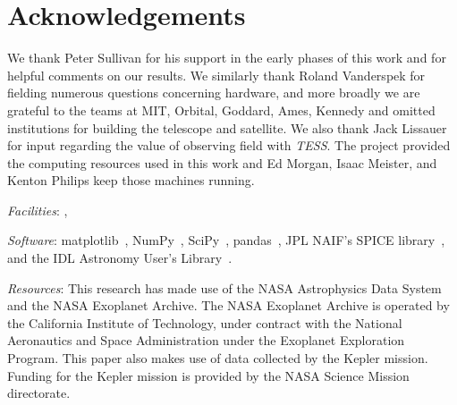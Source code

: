 \section*{Acknowledgements}
We thank Peter Sullivan for his support in the early phases of this 
work and for helpful comments on our results.
We similarly thank Roland Vanderspek for fielding numerous questions
concerning \tess hardware, and more broadly we are grateful to the teams 
at MIT, Orbital, Goddard, Ames, Kennedy and omitted institutions for 
building the telescope and satellite.
We also thank Jack Lissauer for input regarding the value of observing 
\keplers field with \textit{TESS}.
The \tess project provided the computing resources used in this work and Ed 
Morgan, Isaac Meister, and Kenton Philips keep those machines running.

\vspace{0.5cm}
\textit{Facilities}: \tess, \kepler

\textit{Software}: matplotlib~\citep{hunter_matplotlib_2007}, NumPy~\citep{walt_numpy_2011}, SciPy~\citep{jones_scipy_2001}, pandas~\citep{mckinneypandas}, JPL NAIF's SPICE library~\citep{acton_SPICE_1996}, and the IDL Astronomy User's Library~\citep{landsman_idl_1995}.

\textit{Resources}: This research has made use of the NASA Astrophysics Data System and the NASA Exoplanet Archive. The NASA Exoplanet Archive is operated by the California Institute of Technology, under contract with the National Aeronautics and Space Administration under the Exoplanet Exploration Program.
This paper also makes use of data collected by the Kepler mission. Funding for the Kepler mission is provided by the NASA Science Mission directorate.
